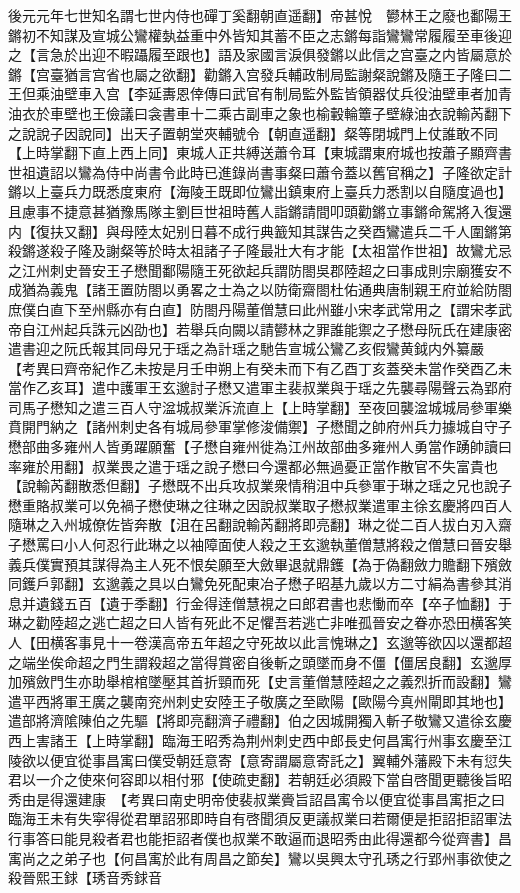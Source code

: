 後元元年七世知名謂七世内侍也磾丁奚翻朝直遥翻】帝甚悅　鬰林王之廢也鄱陽王鏘初不知謀及宣城公鸞權埶益重中外皆知其蓄不臣之志鏘每詣鸞鸞常履履至車後迎之【言急於出迎不暇躡履至跟也】語及家國言淚俱發鏘以此信之宫臺之内皆屬意於鏘【宫臺猶言宫省也屬之欲翻】勸鏘入宫發兵輔政制局監謝粲說鏘及隨王子隆曰二王但乘油壁車入宫【李延夀恩倖傳曰武官有制局監外監皆領器仗兵役油壁車者加青油衣於車壁也王儉議曰衾書車十二乘古副車之象也榆轂輪簟子壁綠油衣說輸芮翻下之說說子因說同】出天子置朝堂夾輔號令【朝直遥翻】粲等閉城門上仗誰敢不同【上時掌翻下直上西上同】東城人正共縛送蕭令耳【東城謂東府城也按蕭子顯齊書世祖遺詔以鸞為侍中尚書令此時已進錄尚書事粲曰蕭令蓋以舊官稱之】子隆欲定計鏘以上臺兵力既悉度東府【海陵王既即位鸞出鎮東府上臺兵力悉割以自隨度過也】且慮事不捷意甚猶豫馬隊主劉巨世祖時舊人詣鏘請間叩頭勸鏘立事鏘命駕將入復還内【復扶又翻】與母陸太妃别日暮不成行典籖知其謀告之癸酉鸞遣兵二千人圍鏘第殺鏘遂殺子隆及謝粲等於時太祖諸子子隆最壯大有才能【太祖當作世祖】故鸞尤忌之江州刺史晉安王子懋聞鄱陽隨王死欲起兵謂防閤吳郡陸超之曰事成則宗廟獲安不成猶為義鬼【諸王置防閤以勇畧之士為之以防衛齋閤杜佑通典唐制親王府並給防閤庶僕白直下至州縣亦有白直】防閤丹陽董僧慧曰此州雖小宋孝武常用之【謂宋孝武帝自江州起兵誅元凶劭也】若舉兵向闕以請鬰林之罪誰能禦之子懋母阮氏在建康密遣書迎之阮氏報其同母兄于瑶之為計瑶之馳告宣城公鸞乙亥假鸞黄鉞内外纂嚴　【考異曰齊帝紀作乙未按是月壬申朔上有癸未而下有乙酉丁亥蓋癸未當作癸酉乙未當作乙亥耳】遣中護軍王玄邈討子懋又遣軍主裴叔業與于瑶之先襲尋陽聲云為郢府司馬子懋知之遣三百人守湓城叔業泝流直上【上時掌翻】至夜回襲湓城城局參軍樂賁開門納之【諸州刺史各有城局參軍掌修浚備禦】子懋聞之帥府州兵力據城自守子懋部曲多雍州人皆勇躍願奮【子懋自雍州徙為江州故部曲多雍州人勇當作踴帥讀曰率雍於用翻】叔業畏之遣于瑶之說子懋曰今還都必無過憂正當作散官不失富貴也【說輸芮翻散悉但翻】子懋既不出兵攻叔業衆情稍沮中兵參軍于琳之瑶之兄也說子懋重賂叔業可以免禍子懋使琳之往琳之因說叔業取子懋叔業遣軍主徐玄慶將四百人隨琳之入州城僚佐皆奔散【沮在呂翻說輸芮翻將即亮翻】琳之從二百人拔白刃入齋子懋罵曰小人何忍行此琳之以袖障面使人殺之王玄邈執董僧慧將殺之僧慧曰晉安舉義兵僕實預其謀得為主人死不恨矣願至大斂畢退就鼎鑊【為于偽翻斂力贍翻下殯斂同鑊戶郭翻】玄邈義之具以白鸞免死配東冶子懋子昭基九歲以方二寸絹為書參其消息并遺錢五百【遺于季翻】行金得逹僧慧視之曰郎君書也悲慟而卒【卒子恤翻】于琳之勸陸超之逃亡超之曰人皆有死此不足懼吾若逃亡非唯孤晉安之眷亦恐田横客笑人【田横客事見十一卷漢高帝五年超之守死故以此言愧琳之】玄邈等欲囚以還都超之端坐俟命超之門生謂殺超之當得賞密自後斬之頭墜而身不僵【僵居良翻】玄邈厚加殯斂門生亦助舉棺棺墜壓其首折頸而死【史言董僧慧陸超之之義烈折而設翻】鸞遣平西將軍王廣之襲南兖州刺史安陸王子敬廣之至歐陽【歐陽今真州閘即其地也】遣部將濟隂陳伯之先驅【將即亮翻濟子禮翻】伯之因城開獨入斬子敬鸞又遣徐玄慶西上害諸王【上時掌翻】臨海王昭秀為荆州刺史西中郎長史何昌㝢行州事玄慶至江陵欲以便宜從事昌㝢曰僕受朝廷意寄【意寄謂屬意寄託之】翼輔外藩殿下未有愆失君以一介之使來何容即以相付邪【使疏吏翻】若朝廷必須殿下當自啓聞更聽後旨昭秀由是得還建康　【考異曰南史明帝使裴叔業賫旨詔昌㝢令以便宜從事昌㝢拒之曰臨海王未有失寜得從君單詔邪即時自有啓聞須反更議叔業曰若爾便是拒詔拒詔軍法行事答曰能見殺者君也能拒詔者僕也叔業不敢逼而退昭秀由此得還都今從齊書】昌㝢尚之之弟子也【何昌㝢於此有周昌之節矣】鸞以吳興太守孔琇之行郢州事欲使之殺晉熙王銶【琇音秀銶音